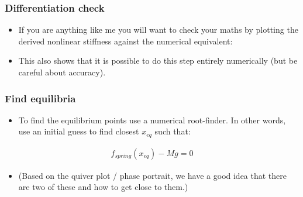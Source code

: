 \documentclass[9pt]{beamer-control}
\begin{document}
\begin{frame}
  \frametitle{Differentiation check}
  \begin{itemize}
    \item If you are anything like me you will want to check your maths by plotting the derived nonlinear stiffness against the numerical equivalent:
  \end{itemize}


  \begin{itemize}
    \item This also shows that it is possible to do this step entirely numerically (but be careful about accuracy).
  \end{itemize}

\end{frame}

\begin{frame}
  \frametitle{Find equilibria}
  \begin{itemize}
    \item To find the equilibrium points use a numerical root-finder. In other words, use an initial guess to find closest $x_{eq}$ such that:
  \end{itemize}
  \begin{align}
    f_{spring}(x_{eq}) - Mg = 0
  \end{align}
  \begin{itemize}
    \item (Based on the quiver plot / phase portrait, we have a good idea that there are two of these and how to get close to them.)
  \end{itemize}

\end{frame}
\end{document}
